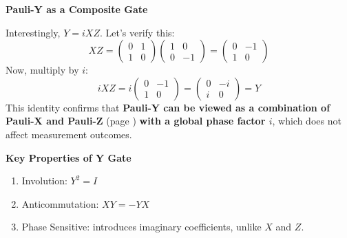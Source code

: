 \highspace
\begin{flushleft}
    \textcolor{Green3}{ \textbf{Pauli-Y as a Composite Gate}}
\end{flushleft}
Interestingly, $Y = i X Z$. Let's verify this:
\begin{equation*}
    XZ = \begin{pmatrix}
        0 & 1 \\ 1 & 0
    \end{pmatrix}
    \begin{pmatrix}
        1 & 0 \\ 0 & -1
    \end{pmatrix}
    =
    \begin{pmatrix}
        0 & -1 \\ 1 & 0
    \end{pmatrix}
\end{equation*}
Now, multiply by $i$:
\begin{equation*}
    iXZ = i \begin{pmatrix}
        0 & -1 \\ 1 & 0
    \end{pmatrix}
    =
    \begin{pmatrix}
        0 & -i \\ i & 0
    \end{pmatrix}
    = Y
\end{equation*}
This identity confirms that \textbf{Pauli-Y can be viewed as a combination of Pauli-X and Pauli-Z} (page \pageref{subsubsection: Pauli-Z (Phase Flip) Gate}) \textbf{with a global phase factor $i$}, which does not affect measurement outcomes.

\highspace
\begin{flushleft}
    \textcolor{Green3}{ \textbf{Key Properties of Y Gate}}
\end{flushleft}
\begin{enumerate}
    \item Involution: $Y^{2} = I$
    \item Anticommutation: $XY = -YX$
    \item Phase Sensitive: introduces imaginary coefficients, unlike $X$ and $Z$.
\end{enumerate}
